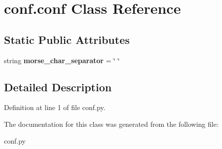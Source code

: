 \hypertarget{classconf_1_1conf}{}\section{conf.\+conf Class Reference}
\label{classconf_1_1conf}
\subsection*{Static Public Attributes}
\begin{DoxyCompactItemize}
\item 
\mbox{\label{classconf_1_1conf_a66f4110c5dad3b1f0265097f66383969}} 
string {\bfseries morse\+\_\+char\+\_\+separator} = \char`\"{} \char`\"{}
\end{DoxyCompactItemize}


\subsection{Detailed Description}


Definition at line 1 of file conf.\+py.



The documentation for this class was generated from the following file\+:\begin{DoxyCompactItemize}
\item 
conf.\+py\end{DoxyCompactItemize}
